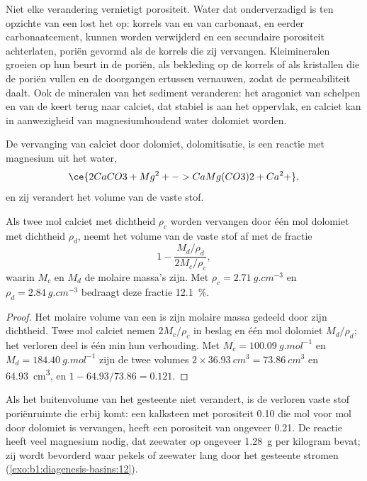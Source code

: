 Niet elke verandering vernietigt porositeit. Water dat onderverzadigd is ten opzichte van een  lost het op: korrels van  en van carbonaat, en eerder carbonaatcement, kunnen worden verwijderd en een secundaire porositeit achterlaten, poriën gevormd als de korrels die zij vervangen. Kleimineralen groeien op hun beurt in de poriën, als bekleding op de korrels of als kristallen die de poriën vullen en de doorgangen ertussen vernauwen, zodat de permeabiliteit daalt. Ook de mineralen van het sediment veranderen: het aragoniet van schelpen en van de  keert terug naar calciet, dat stabiel is aan het oppervlak, en calciet kan in aanwezigheid van magnesiumhoudend water dolomiet worden.

De vervanging van calciet door dolomiet, dolomitisatie, is een reactie met
magnesium uit het water,
\[
  \ce{2 CaCO3 + Mg^2+ -> CaMg(CO3)2 + Ca^2+},
\]
en zij verandert het volume van de vaste stof.

\begin{proposition}\label{prop:b1:diagenesis-basins:dolomite}
Als twee mol calciet met dichtheid $\rho_c$ worden vervangen door één mol dolomiet met dichtheid $\rho_d$, neemt het volume van de vaste stof af met de fractie
\[
  1 - \frac{M_d/\rho_d}{2M_c/\rho_c},
\]
waarin $M_c$ en $M_d$ de molaire massa's zijn. Met $\rho_c = \qty{2.71}{g.cm^{-3}}$
en $\rho_d = \qty{2.84}{g.cm^{-3}}$ bedraagt deze fractie \qty{12.1}{\percent}.
\end{proposition}

\begin{proof}
Het molaire volume van een  is zijn molaire massa gedeeld door zijn dichtheid. Twee mol calciet nemen $2M_c/\rho_c$ in beslag en één mol dolomiet $M_d/\rho_d$; het verloren deel is één min hun verhouding. Met $M_c = \qty{100.09}{g.mol^{-1}}$ en $M_d = \qty{184.40}{g.mol^{-1}}$ zijn de twee volumes $2\times\qty{36.93}{cm^3} = \qty{73.86}{cm^3}$ en \qty{64.93}{cm^3}, en $1 - 64.93/73.86 = \num{0.121}$.
\end{proof}

Als het buitenvolume van het gesteente niet verandert, is de verloren vaste stof poriënruimte die erbij komt: een kalksteen met porositeit \num{0.10} die mol voor mol door dolomiet is vervangen, heeft een porositeit van ongeveer \num{0.21}. De reactie heeft veel magnesium nodig, dat zeewater op ongeveer \qty{1.28}{g} per kilogram bevat; zij wordt bevorderd waar pekels of zeewater lang door het gesteente stromen (\cref{exo:b1:diagenesis-basins:12}).

